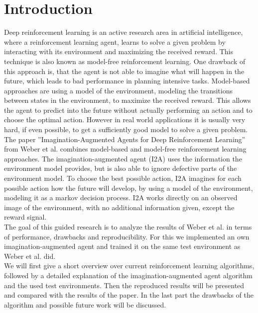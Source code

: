 \section{Introduction}

Deep reinforcement learning is an active research area in artificial intelligence, where a reinforcement learning agent, learns to solve a given problem by interacting with its environment and maximizing the received reward.
This technique is also known as model-free reinforcement learning. 
One drawback of this approach is, that the agent is not able to imagine what will happen in the future, which leads to bad performance in planning intensive tasks.
Model-based approaches are using a model of the environment,  modeling the transitions between states in the environment, to maximize the received reward. This allows the agent to predict into the future without actually performing an action and to choose the optimal action.
However in real world applications it is usually very hard, if even possible, to get a sufficiently good model to solve a given problem.\\

The paper ”Imagination-Augmented Agents for Deep Reinforcement Learning” from Weber et al. \cite{I2A} combines model-based and model-free reinforcement learning approaches.
The imagination-augmented agent (I2A) uses the information the environment model provides, but is also able to ignore defective parts of the environment model. 
To choose the best possible action, I2A imagines for each possible action how the future will develop, by using a model of the environment, modeling it as a markov decision process. 
I2A works directly on an observed image of the environment, with no additional information given, except the reward signal.\\

The goal of this guided research is to analyze the results of Weber et al. in terms of performance, drawbacks and reproducibility.
For this we implemented an own imagination-augmented agent and trained it on the same test environment as Weber et al. did.\\

We will first give a short overview over current reinforcement learning algorithms, followed by a detailed explanation of the imagination-augmented agent algorithm and the used test environments. Then the reproduced results will be presented and compared with the results of the paper. In the last part the drawbacks of the algorithm and possible future work will be discussed.


